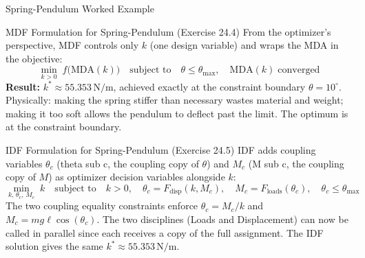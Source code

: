 \documentclass[aspectratio=169,10pt]{beamer}
\begin{document}
\begin{frame}[allowframebreaks]{Spring-Pendulum Worked Example}
  \begin{block}{MDF Formulation for Spring-Pendulum (Exercise 24.4)}
    From the optimizer's perspective, MDF controls only $k$ (one design
    variable) and wraps the MDA in the objective:
    \[
      \min_{k > 0}\; f\!\bigl(\mathrm{MDA}(k)\bigr)
      \quad \text{subject to} \quad \theta \leq \theta_{\max},
      \quad \mathrm{MDA}(k)\;\text{converged}
    \]
    \textbf{Result:} $k^* \approx 55.353\,\text{N/m}$, achieved exactly at
    the constraint boundary $\theta = 10^\circ$.
    Physically: making the spring stiffer than necessary wastes material and
    weight; making it too soft allows the pendulum to deflect past the limit.
    The optimum is at the constraint boundary.
  \end{block}

  \begin{block}{IDF Formulation for Spring-Pendulum (Exercise 24.5)}
    IDF adds coupling variables $\theta_c$ (theta sub c, the coupling copy
    of $\theta$) and $M_c$ (M sub c, the coupling copy of $M$) as optimizer
    decision variables alongside $k$:
    \[
      \min_{k,\,\theta_c,\,M_c}\; k
      \quad \text{subject to} \quad
      k > 0, \quad
      \theta_c = F_{\mathrm{disp}}(k, M_c), \quad
      M_c = F_{\mathrm{loads}}(\theta_c), \quad
      \theta_c \leq \theta_{\max}
    \]
    The two coupling equality constraints enforce $\theta_c = M_c / k$
    and $M_c = mg\ell\cos(\theta_c)$.  The two disciplines (Loads and
    Displacement) can now be called in parallel since each receives a
    copy of the full assignment.  The IDF solution gives the same
    $k^* \approx 55.353\,\text{N/m}$.
  \end{block}

\end{frame}
\end{document}
